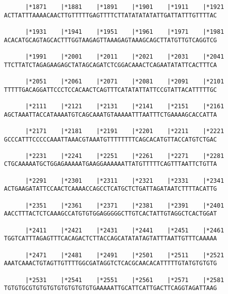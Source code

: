 \documentclass{article}
\begin{document}
\begin{Verbatim}
      |*1871    |*1881    |*1891    |*1901    |*1911    |*1921
ACTTATTTAAAACAACTTGTTTTTGAGTTTTCTTATATATATATTGATTATTTGTTTTAC
                                                            
      |*1931    |*1941    |*1951    |*1961    |*1971    |*1981
ACACATGCAGTAGCACTTTGGTAAGAGTTAAAGAGTAAAGCAGCTTATGTTGTCAGGTCG
                                                            
      |*1991    |*2001    |*2011    |*2021    |*2031    |*2041
TTCTTATCTAGAGAAGAGCTATAGCAGATCTCGGACAAACTCAGAATATATTCACTTTCA
                                                            
      |*2051    |*2061    |*2071    |*2081    |*2091    |*2101
TTTTTGACAGGATTCCCTCCACAACTCAGTTTCATATATTATTCCGTATTACATTTTTGC
                                                            
      |*2111    |*2121    |*2131    |*2141    |*2151    |*2161
AGCTAAATTACCATAAAATGTCAGCAAATGTAAAAATTTAATTTCTGAAAAGCACCATTA
                                                            
      |*2171    |*2181    |*2191    |*2201    |*2211    |*2221
GCCCATTTCCCCCAAATTAAACGTAAATGTTTTTTTTCAGCACATGTTACCATGTCTGAC
                                                            
      |*2231    |*2241    |*2251    |*2261    |*2271    |*2281
CTGCAAAAATGCTGGAGAAAAATGAAGGAAAAAATTATGTTTTTCAGTTTAATTCTGTTA
                                                            
      |*2291    |*2301    |*2311    |*2321    |*2331    |*2341
ACTGAAGATATTCCAACTCAAAACCAGCCTCATGCTCTGATTAGATAATCTTTTACATTG
                                                            
      |*2351    |*2361    |*2371    |*2381    |*2391    |*2401
AACCTTTACTCTCAAAGCCATGTGTGGAGGGGGCTTGTCACTATTGTAGGCTCACTGGAT
                                                            
      |*2411    |*2421    |*2431    |*2441    |*2451    |*2461
TGGTCATTTAGAGTTTCACAGACTCTTACCAGCATATATAGTATTTAATTGTTTCAAAAA
                                                            
      |*2471    |*2481    |*2491    |*2501    |*2511    |*2521
AAATCAAACTGTAGTTGTTTTGGCGATAGGTCTCACGCAACACATTTTTGTATGTGTGTG
                                                            
      |*2531    |*2541    |*2551    |*2561    |*2571    |*2581
TGTGTGCGTGTGTGTGTGTGTGTGTGAAAAATTGCATTCATTGACTTCAGGTAGATTAAG
                                                            

\end{Verbatim}
\end{document}

